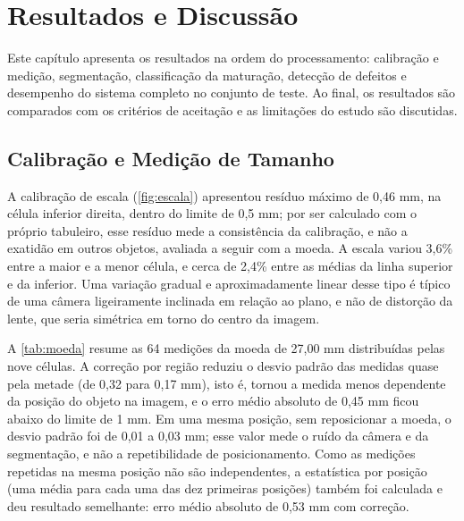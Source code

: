 \chapter{Resultados e Discussão}\label{cap:resultados}

Este capítulo apresenta os resultados na ordem do processamento: calibração e medição, segmentação, classificação da maturação, detecção de defeitos e desempenho do sistema completo no conjunto de teste. Ao final, os resultados são comparados com os critérios de aceitação e as limitações do estudo são discutidas.

\section{Calibração e Medição de Tamanho}

A calibração de escala (\autoref{fig:escala}) apresentou resíduo máximo de 0,46 mm, na célula inferior direita, dentro do limite de 0,5 mm; por ser calculado com o próprio tabuleiro, esse resíduo mede a consistência da calibração, e não a exatidão em outros objetos, avaliada a seguir com a moeda. A escala variou 3,6\% entre a maior e a menor célula, e cerca de 2,4\% entre as médias da linha superior e da inferior. Uma variação gradual e aproximadamente linear desse tipo é típico de uma câmera ligeiramente inclinada em relação ao plano, e não de distorção da lente, que seria simétrica em torno do centro da imagem.

A \autoref{tab:moeda} resume as 64 medições da moeda de 27,00 mm distribuídas pelas nove células. A correção por região reduziu o desvio padrão das medidas quase pela metade (de 0,32 para 0,17 mm), isto é, tornou a medida menos dependente da posição do objeto na imagem, e o erro médio absoluto de 0,45 mm ficou abaixo do limite de 1 mm. Em uma mesma posição, sem reposicionar a moeda, o desvio padrão foi de 0,01 a 0,03 mm; esse valor mede o ruído da câmera e da segmentação, e não a repetibilidade de posicionamento. Como as medições repetidas na mesma posição não são independentes, a estatística por posição (uma média para cada uma das dez primeiras posições) também foi calculada e deu resultado semelhante: erro médio absoluto de 0,53 mm com correção.

